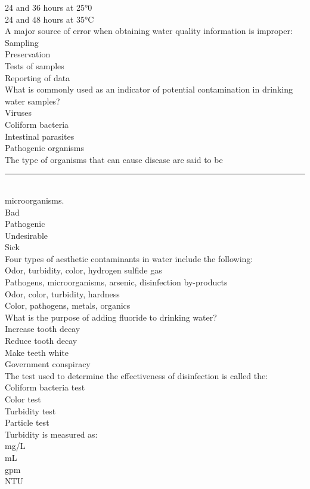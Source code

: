 	24 and 36 hours at 25°0\\
	24 and 48 hours at 35°C\\
A major source of error when obtaining water quality information is improper:\\
Sampling\\
Preservation\\
Tests of samples\\
Reporting of data\\
What is commonly used as an indicator of potential contamination in drinking water samples?\\
Viruses\\
Coliform bacteria\\
Intestinal parasites\\
Pathogenic organisms\\
The type of organisms that can cause disease are said to be \rule{2cm}{0.3pt}\\
microorganisms.\\
Bad\\
Pathogenic\\
Undesirable\\
Sick\\
Four types of aesthetic contaminants in water include the following:\\
Odor, turbidity, color, hydrogen sulfide gas\\
Pathogens, microorganisms, arsenic, disinfection by-products\\
Odor, color, turbidity, hardness\\
Color, pathogens, metals, organics\\
What is the purpose of adding fluoride to drinking water?\\
Increase tooth decay\\
Reduce tooth decay\\
Make teeth white\\
Government conspiracy\\
The test used to determine the effectiveness of disinfection is called the:\\
Coliform bacteria test\\
Color test\\
Turbidity test\\
Particle test\\
Turbidity is measured as:\\
mg/L\\
mL\\
gpm\\
NTU\\
